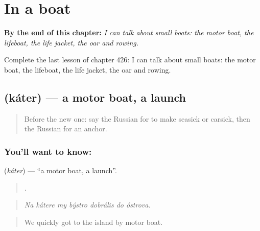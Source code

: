 
\chapter{In a boat}
\label{ch:ru-in-a-boat}

\begin{chapteropening}
\textbf{By the end of this chapter:} \emph{I can talk about small boats: the motor boat, the lifeboat, the life jacket, the oar and rowing.}

Complete the last lesson of chapter 426: I can talk about small boats: the motor boat, the lifeboat, the life jacket, the oar and rowing.
\end{chapteropening}

\section[\texorpdfstring{\ru{катер} (káter)}{катер (káter)}]{ (káter) — a motor boat, a launch}

\label{lesson:RU-C426-kater}



\begin{quote}
Before the new one: say the Russian for to make seasick or carsick, then the Russian for an anchor.
\end{quote}

\subsection*{You'll want to know: }
\textbf{} (\emph{káter}) — \textquotedblleft{}a motor boat, a launch\textquotedblright{}.

\begin{quote}
      .
\end{quote}

\begin{quote}
\emph{Na kátere my býstro dobrális do óstrova.}
\end{quote}

\begin{quote}
We quickly got to the island by motor boat.
\end{quote}

